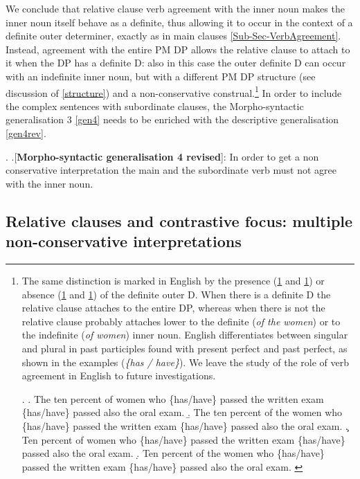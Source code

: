 \documentclass[charis, linguex]{glossa}
\begin{document}
We conclude that relative clause verb agreement with the inner noun makes the inner noun itself behave as a definite, thus allowing it to occur in the context of a definite outer determiner, exactly as in main clauses \ref{Sub-Sec-VerbAgreement}. Instead, agreement with the entire PM DP allows the relative clause to attach to it when the DP has a definite D: also in this case the outer definite D can occur with an indefinite inner noun, but with a different PM DP structure (see discussion of \ref{structure}) and a non-conservative construal.\footnote{The same distinction is marked in English by the presence (\ref{theofstudents} and \ref{theofthestudents})  or absence (\ref{ofstudents} and \ref{ofthestudents}) of the definite outer D. When there is a definite D the relative clause attaches to the entire DP, whereas when there is not the relative clause probably attaches lower to the definite (\textit{of the women}) or to the indefinite (\textit{of women}) inner noun. English differentiates between singular and plural in past participles found with present perfect and past perfect, as shown in the examples (\textit{\{has / have\}}). We leave the study of the role of verb agreement in English to future investigations.

\ex. 
\a.   The ten percent of women who \{has/have\} passed the written exam  \{has/have\} passed also the oral exam. \label{theofstudents} 
\b.   The ten percent of the women who \{has/have\} passed the written exam  \{has/have\} passed also the oral exam.  \label{theofthestudents} 
 \c.   Ten percent of women who  \{has/have\} passed the written exam  \{has/have\} passed also the oral exam. \label{ofstudents}   
\d.    Ten percent of the women who   \{has/have\} passed the written exam  \{has/have\} passed also the oral exam. \label{ofthestudents}

	} In order to include the complex sentences with subordinate clauses, the Morpho-syntactic generalisation 3 \ref{gen4} needs to be enriched with the descriptive generalisation \ref{gen4rev}.

\ex.\label{gen4rev} \a.[{\bf Morpho-syntactic generalisation 4 revised}]: In order to get a non conservative interpretation the main and the subordinate verb must not agree with the inner noun.

\subsection{Relative clauses and contrastive focus: multiple non-conservative interpretations} \label{SubSec-RelFocus}
\end{document}
